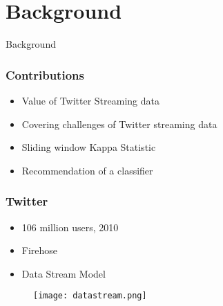 \section{Background}

\begin{frame}
        \centering
        \huge Background
\end{frame}

\begin{frame}
	\frametitle{Contributions}
	\begin{itemize}
		\item Value of Twitter Streaming data
		\item Covering challenges of Twitter streaming data
		\item Sliding window Kappa Statistic
		\item Recommendation of a classifier
	\end{itemize}
\end{frame}

\begin{frame}
	\frametitle{Twitter}
	\begin{itemize}
		\item 106 million users, 2010
		\item Firehose
		\item Data Stream Model
	\end{itemize}
	\begin{figure}
		\centering
		\texttt{[image: datastream.png]}
	\end{figure}
\end{frame}

